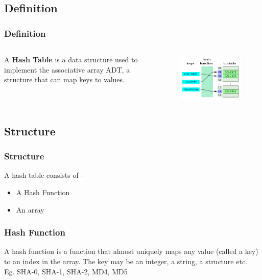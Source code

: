 \documentclass{beamer}
\begin{document}
\subsection{Definition}
\begin{frame}
\frametitle{Definition}
\begin{columns}[c] %


A \textbf{Hash Table} is a data structure used to implement the associative array ADT, a structure that can map keys to values.


\begin{figure}
\includegraphics[width=0.8\linewidth]{hash.png}
\end{figure}


\end{columns}
\end{frame}

\subsection{Structure}
\begin{frame}
\frametitle{Structure}
A hash table consists of -
\begin{itemize}
  \item A Hash Function
  \item An array
\end{itemize}
\end{frame}

\begin{frame}
\frametitle{Hash Function}
A hash function is a function that almost uniquely maps any value (called a key) to an index in the array.
The key may be an integer, a string, a structure etc.\\
Eg. SHA-0, SHA-1, SHA-2, MD4, MD5
\end{frame}
\end{document}
